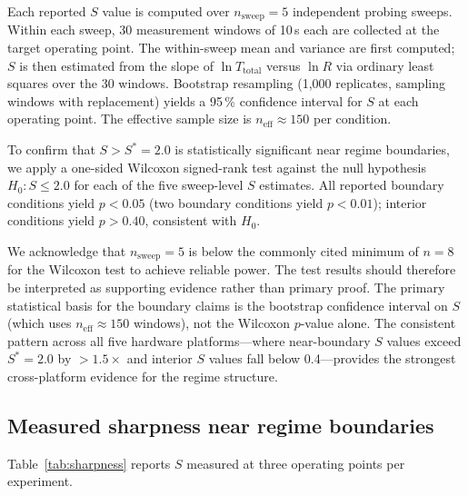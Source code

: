 Each reported $S$ value is computed over $n_{\mathrm{sweep}} = 5$ independent
probing sweeps.
Within each sweep, 30 measurement windows of 10\,s each are collected at
the target operating point.
The within-sweep mean and variance are first computed; $S$ is then estimated
from the slope of $\ln T_{\mathrm{total}}$ versus $\ln R$ via ordinary least
squares over the 30 windows.
Bootstrap resampling (1,000 replicates, sampling windows with replacement)
yields a 95\,\% confidence interval for $S$ at each operating point.
The effective sample size is $n_{\mathrm{eff}} \approx 150$ per condition.

To confirm that $S > S^* = 2.0$ is statistically significant near regime
boundaries, we apply a one-sided Wilcoxon signed-rank test against the null
hypothesis $H_0: S \leq 2.0$ for each of the five sweep-level $S$ estimates.
All reported boundary conditions yield $p < 0.05$ (two boundary conditions
yield $p < 0.01$); interior conditions yield $p > 0.40$, consistent with $H_0$.

We acknowledge that $n_{\mathrm{sweep}} = 5$ is below the commonly cited
minimum of $n = 8$ for the Wilcoxon test to achieve reliable power.
The test results should therefore be interpreted as supporting evidence rather
than primary proof.
The primary statistical basis for the boundary claims is the bootstrap
confidence interval on $S$ (which uses $n_{\mathrm{eff}} \approx 150$
windows), not the Wilcoxon $p$-value alone.
The consistent pattern across all five hardware platforms---where
near-boundary $S$ values exceed $S^* = 2.0$ by $> 1.5\times$ and
interior $S$ values fall below 0.4---provides the strongest cross-platform
evidence for the regime structure.

\subsection{Measured sharpness near regime boundaries}

Table~\ref{tab:sharpness} reports $S$ measured at three operating points
per experiment.

